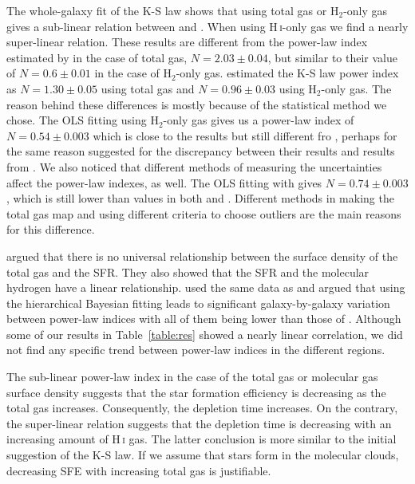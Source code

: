 The whole-galaxy fit of the K-S law shows that using total gas or H$_{2}$-only gas gives a sub-linear relation between \sigmasfr and \sigmatotalgas. When using  H\,{\textsc i}-only gas we find a nearly super-linear relation. These results are different from the power-law index estimated by \citet{Ford13}  in the case of total gas, $N=2.03\pm0.04$, but similar to their value of $N=0.6\pm0.01$ in the case of H$_{2}$-only gas. 
\citet{Tabatabaei10} estimated the K-S law power index as $N=1.30\pm0.05$ using total gas and $N=0.96\pm0.03$ using H$_{2}$-only gas. The reason behind these differences is mostly because of the statistical method we chose. The OLS fitting using H$_{2}$-only gas gives us a power-law index of $N=0.54\pm0.003$ which is close to the \citet{Ford13} results but still different fro \citet{Tabatabaei10}, perhaps for the same reason \citet{Ford13} suggested for the discrepancy between their results and results from \citet{Tabatabaei10}. We also noticed that different methods of measuring the uncertainties affect the power-law indexes, as well. The OLS fitting with \sigmatotalgas gives $N=0.74\pm0.003$, which is still lower than values in both  \citet{Tabatabaei10} and  \citet{Ford13}. Different methods in making the total gas map and using different criteria to choose outliers are the main reasons for this difference.

 \citet{Bigiel08} argued that there is no universal relationship between the surface density of the total gas and the SFR. They also showed that the SFR and the molecular hydrogen have a linear relationship. \citet{Shetty13} used the same data as \citet{Bigiel08} and argued that using the hierarchical Bayesian fitting leads to significant galaxy-by-galaxy variation between power-law indices with all of them being lower than those of \citet{Bigiel08}. Although some of our results in Table~\ref{table:res} showed a nearly linear correlation, we did not find any specific trend between power-law indices in the different regions.

The sub-linear power-law index in the case of the total gas or molecular gas surface density suggests that the star formation efficiency is decreasing as the total gas increases. Consequently, the depletion time increases. On the contrary, the super-linear relation suggests that the depletion time is decreasing with an increasing amount of H\,{\textsc i} gas. The latter conclusion is more similar to the initial suggestion of the K-S law. If we assume that stars form in the molecular clouds, decreasing SFE with increasing total gas is justifiable.

